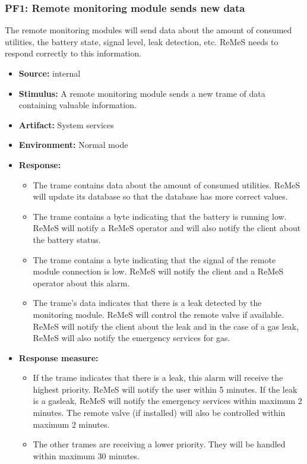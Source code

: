 \subsubsection{PF1: Remote monitoring module sends new data}
The remote monitoring modules will send data about the amount of consumed utilities, the battery state, 
signal level, leak detection, etc. ReMeS needs to respond correctly to this information.
\begin{itemize}
	\item \textbf{Source:} internal
	\item \textbf{Stimulus:} 
		A remote monitoring module sends a new trame of data containing valuable information.
	\item \textbf{Artifact:} System services
	\item \textbf{Environment:} Normal mode
	\item \textbf{Response:} 
		\begin{itemize}
			\item The trame contains data about the amount of consumed utilities. ReMeS will update its database
					so that the database has more correct values.
			\item The trame contains a byte indicating that the battery is running low. ReMeS will notify a ReMeS
					operator and will also notify the client about the battery status.
			\item The trame contains a byte indicating that the signal of the remote module connection is low. ReMeS
					will notify the client and a ReMeS operator about this alarm.
			\item The trame's data indicates that there is a leak detected by the monitoring module. ReMeS will
					control the remote valve if available. ReMeS will notify the client about the leak and in the case
					of a gas leak, ReMeS will also notify the emergency services for gas.
		\end{itemize}
	\item \textbf{Response measure:} 
		\begin{itemize}
			\item If the trame indicates that there is a leak, this alarm will receive the highest priority. ReMeS will notify the user within 5 minutes. If the
					leak is a gasleak, ReMeS will notify the emergency services within maximum 2 minutes. The remote
					valve (if installed) will also be controlled within maximum 2 minutes.
			\item The other trames are receiving a lower priority. They will be handled within maximum 30 minutes.
		\end{itemize}
\end{itemize}